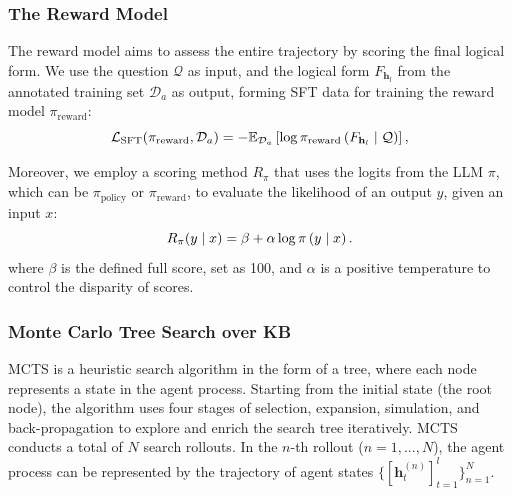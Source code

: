 \documentclass{article}
\theoremstyle{plain}
\theoremstyle{definition}
\theoremstyle{remark}
\begin{document}
\subsubsection{The Reward Model}
The reward model aims to assess the entire trajectory by scoring the final logical form.
We use the question $\mathcal{Q}$ as input, and the logical form $F_{\mathbf{h}_l}$ from the annotated training set $\mathcal{D}_a$ as output, forming SFT data for training the reward model $\pi_{\text{reward}}$:
\begin{equation}
\small
    \mathcal{L}_{\text{SFT}}(\pi_{\text{reward}}, \mathcal{D}_a) = - \mathbb{E}_{\mathcal{D}_a} \left[ \log \pi_{\text{reward}} \left(F_{\mathbf{h}_l} \mid \mathcal{Q}\right) \right],
\end{equation}

Moreover, we employ a scoring method $R_{\pi}$ that uses the logits from the LLM $\pi$, which can be $\pi_{\text{policy}}$ or $\pi_{\text{reward}}$, to evaluate the likelihood of an output $y$, given an input $x$:
\begin{equation}
\small
    R_{\pi}(y \mid x)=\beta +\alpha \log \pi\left(y \mid x\right).
\end{equation}
where $\beta$ is the defined full score, set as 100, and $\alpha$ is a positive temperature to control the disparity of scores.



\subsubsection{Monte Carlo Tree Search over KB}
MCTS is a heuristic search algorithm in the form of a tree, where each node represents a state in the agent process. Starting from the initial state (the root node), the algorithm uses four stages of selection, expansion, simulation, and back-propagation to explore and enrich the search tree iteratively. MCTS conducts a total of $N$ search rollouts. In the $n$-th rollout ($n=1,...,N$), the agent process can be represented by the trajectory of agent states $\{[\mathbf{h}^{(n)}_t]_{t=1}^l\}_{n=1}^N$.
\end{document}
